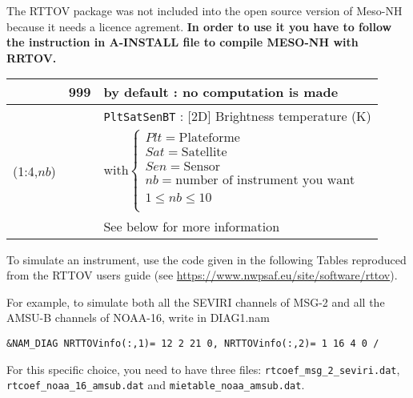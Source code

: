 The RTTOV package was not included into the open source version of Meso-NH because it needs a licence agrement.
{\bf In order to use it you have to follow the instruction in A-INSTALL file to compile MESO-NH with RRTOV.}   

\begin{center}
\begin{makeimage}
\begin{tabular}{|>{\centering}p{3.1cm}|>{\centering}p{2.4cm}|p{11cm}|}
\hline
\multirow{5}{*}{NRTTOVinfo}\index{NRTTOVinfo!\innam{NAM\_DIAG}}&\textbf{999} & by default : no computation is made\\\cline{2-3}
& \multirow{4}{*}{$Plt$ $Sat$ $Sen$ 0 } &{\tt PltSatSenBT} : [2D] Brightness temperature (K)\\
(1:4,$nb$)& & 
$
\textrm{with}
\left\{
\begin{array}{l}
Plt = \textrm{Plateforme}\\
Sat = \textrm{Satellite}\\
Sen = \textrm{Sensor}\\ 
nb =  \textrm{number of instrument you want}\\
 1\leq nb\leq10\\
\end{array}
\right.
$
\\ 
& & See below for more information\\\hline 
\end{tabular}
\end{makeimage}
\end{center}


\vspace{0.5cm}
To simulate an instrument, use the code given in the following Tables reproduced from the RTTOV users guide (see \url{https://www.nwpsaf.eu/site/software/rttov}). 

For example, to simulate both all the SEVIRI channels of MSG-2 and all the AMSU-B channels of NOAA-16, write in DIAG1.nam
\begin{verbatim}
&NAM_DIAG NRTTOVinfo(:,1)= 12 2 21 0, NRTTOVinfo(:,2)= 1 16 4 0 /
\end{verbatim}
For this specific choice, you need to have three files:
{\tt rtcoef\_msg\_2\_seviri.dat}, {\tt rtcoef\_noaa\_16\_amsub.dat} and {\tt mietable\_noaa\_amsub.dat}.

